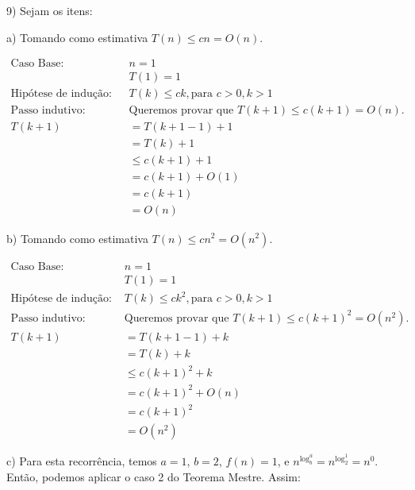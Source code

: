 \documentclass[]{article}
\begin{document}
9) Sejam os itens:

a) Tomando como estimativa $T(n) \leq cn = O(n)$.

\begin{align*}
    \text{Caso Base}: \quad & n = 1 \\
                      \quad & T(1) = 1 \\
    \text{Hipótese de indução:} \quad & T(k) \leq ck, \text{para } c>0, k>1 \\
    \text{Passo indutivo:} \quad & \text{Queremos provar que } T(k+1) \leq c(k+1) = O(n). \\
                            T(k+1) & = T(k+1-1)+1 \\
                                   & = T(k)+1 \\
                                   & \leq c(k+1) + 1 \\
                                   & = c(k+1) + O(1) \\
                                   & = c(k+1) \\
                                   & = O(n)
\end{align*}

b) Tomando como estimativa $T(n) \leq cn^2 = O(n^2)$.

\begin{align*}
    \text{Caso Base}: \quad & n = 1 \\
                      \quad & T(1) = 1 \\
    \text{Hipótese de indução:} \quad & T(k) \leq ck^2, \text{para } c>0, k>1 \\
    \text{Passo indutivo:} \quad & \text{Queremos provar que } T(k+1) \leq c(k+1)^2 = O(n^2). \\
                            T(k+1) & = T(k+1-1)+k \\
                                   & = T(k)+k \\
                                   & \leq c(k+1)^2+k \\
                                   & = c(k+1)^2 + O(n) \\
                                   & = c(k+1)^2 \\
                                   & = O(n^2)
\end{align*}

\newpage

c) Para esta recorrência, temos $a=1$, $b=2$, $f(n)=1$, e $n^{\log_b^a} = n^{\log_2^1} = n^0$. Então, podemos aplicar o caso 2 do Teorema Mestre. Assim:
\end{document}
